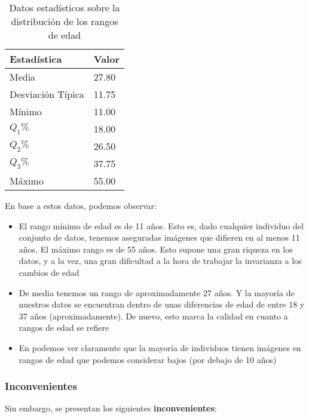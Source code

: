 \begin{table}[H]
\centering
\begin{tabular}{|l|l|}
    \hline
    \textbf{Estadística} & \textbf{Valor} \\
    \hline

    Media             & 27.80 \\
    Desviación Típica & 11.75 \\
    Mínimo            & 11.00 \\
    $Q_1 \%$          & 18.00 \\
    $Q_2 \%$          & 26.50 \\
    $Q_3 \%$          & 37.75 \\
    Máximo            & 55.00 \\

    \hline

\end{tabular}
\caption{Datos estadísticos sobre la distribución de los rangos de edad}
\label{table:fgnet_rangos_estadisticas}
\end{table}

En base a estos datos, podemos observar:

\begin{itemize}
    \item El rango mínimo de edad es de 11 años. Esto es, dado cualquier individuo del conjunto de datos, tenemos aseguradas imágenes que difieren en al menos 11 años. El máximo rango es de 55 años. Esto supone una gran riqueza en los datos, y a la vez, una gran dificultad a la hora de trabajar la invarianza a los cambios de edad
    \item De media tenemos un rango de aproximadamente 27 años. Y la mayoría de nuestros datos se encuentran dentro de unas diferencias de edad de entre 18 y 37 años (aproximadamente). De nuevo, esto marca la calidad en cuanto a rangos de edad se refiere
    \item En  podemos ver claramente que la mayoría de individuos tienen imágenes en rangos de edad que podemos considerar bajos (por debajo de 10 años)
\end{itemize}

\subsubsection{Inconvenientes} \label{isubsubs:fgnet_inconvenientes}

Sin embargo, se presentan los siguientes \textbf{inconvenientes}:

